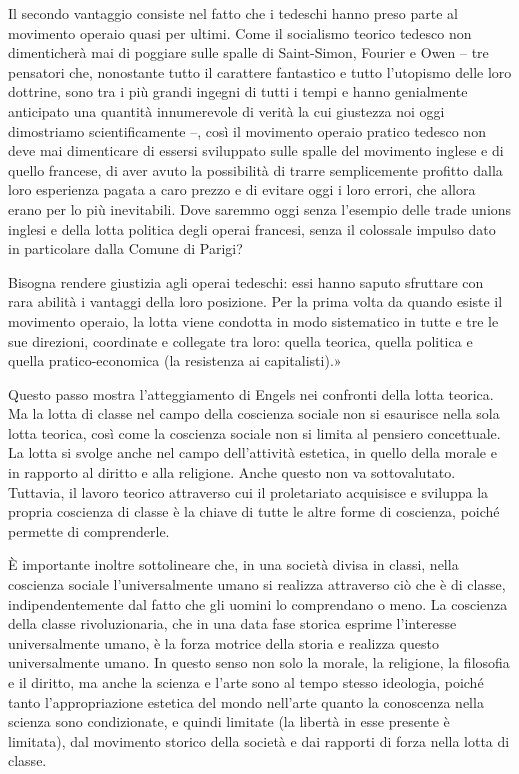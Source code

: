 \documentclass[12pt,a4paper,openany]{book}
\begin{document}
Il secondo vantaggio consiste nel fatto che i tedeschi hanno preso parte al movimento operaio quasi per ultimi. Come il socialismo teorico tedesco non dimenticherà mai di poggiare sulle spalle di Saint-Simon, Fourier e Owen – tre pensatori che, nonostante tutto il carattere fantastico e tutto l'utopismo delle loro dottrine, sono tra i più grandi ingegni di tutti i tempi e hanno genialmente anticipato una quantità innumerevole di verità la cui giustezza noi oggi dimostriamo scientificamente –, così il movimento operaio pratico tedesco non deve mai dimenticare di essersi sviluppato sulle spalle del movimento inglese e di quello francese, di aver avuto la possibilità di trarre semplicemente profitto dalla loro esperienza pagata a caro prezzo e di evitare oggi i loro errori, che allora erano per lo più inevitabili. Dove saremmo oggi senza l'esempio delle trade unions inglesi e della lotta politica degli operai francesi, senza il colossale impulso dato in particolare dalla Comune di Parigi?

Bisogna rendere giustizia agli operai tedeschi: essi hanno saputo sfruttare con rara abilità i vantaggi della loro posizione. Per la prima volta da quando esiste il movimento operaio, la lotta viene condotta in modo sistematico in tutte e tre le sue direzioni, coordinate e collegate tra loro: quella teorica, quella politica e quella pratico-economica (la resistenza ai capitalisti).»

Questo passo mostra l'atteggiamento di Engels nei confronti della lotta teorica. Ma la lotta di classe nel campo della coscienza sociale non si esaurisce nella sola lotta teorica, così come la coscienza sociale non si limita al pensiero concettuale. La lotta si svolge anche nel campo dell'attività estetica, in quello della morale e in rapporto al diritto e alla religione. Anche questo non va sottovalutato. Tuttavia, il lavoro teorico attraverso cui il proletariato acquisisce e sviluppa la propria coscienza di classe è la chiave di tutte le altre forme di coscienza, poiché permette di comprenderle.

È importante inoltre sottolineare che, in una società divisa in classi, nella coscienza sociale l'universalmente umano si realizza attraverso ciò che è di classe, indipendentemente dal fatto che gli uomini lo comprendano o meno. La coscienza della classe rivoluzionaria, che in una data fase storica esprime l'interesse universalmente umano, è la forza motrice della storia e realizza questo universalmente umano. In questo senso non solo la morale, la religione, la filosofia e il diritto, ma anche la scienza e l'arte sono al tempo stesso ideologia, poiché tanto l'appropriazione estetica del mondo nell'arte quanto la conoscenza nella scienza sono condizionate, e quindi limitate (la libertà in esse presente è limitata), dal movimento storico della società e dai rapporti di forza nella lotta di classe.
\end{document}
